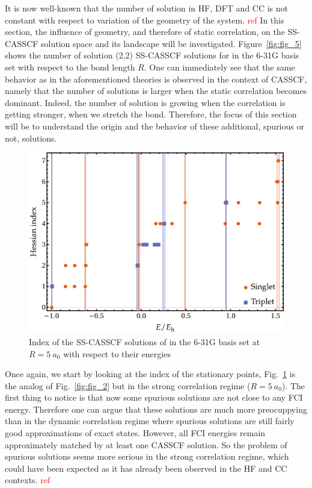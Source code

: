\documentclass[aps,prb,reprint,showkeys,superscriptaddress]{revtex4-1}
\newcommand{\todo}[1]{\textcolor{red}{#1}}
\begin{document}
It is now well-known that the number of solution in HF, DFT and CC is not constant with respect to variation of the geometry of the system. \todo{ref}
In this section, the influence of geometry, and therefore of static correlation, on the SS-CASSCF solution space and its landscape will be investigated.
Figure~\ref{fig:fig_5} shows the number of solution (2,2) SS-CASSCF solutions for  in the 6-31G basis set with respect to the bond length $R$.
One can immediately see that the same behavior as in the aforementioned theories is observed in the context of CASSCF, namely that the number of solutions is larger when the static correlation becomes dominant.
Indeed, the number of solution is growing when the correlation is getting stronger, \ie when we stretch the bond.
Therefore, the focus of this section will be to understand the origin and the behavior of these additional, spurious or not, solutions.

\begin{figure}
  \includegraphics[width=0.9\linewidth]{Figures/fig_3b.pdf}
  \caption{Index of the SS-CASSCF solutions of  in the 6-31G basis set at $R=5~a_0$ with respect to their energies
    \label{fig:fig_6}}
\end{figure}

Once again, we start by looking at the index of the stationary points, Fig.~\ref{fig:fig_6} is the analog of Fig.~\ref{fig:fig_2} but in the strong correlation regime ($R=5~a_0$).
The first thing to notice is that now some spurious solutions are not close to any FCI energy.
Therefore one can argue that these solutions are much more preocuppying than in the dynamic correlation regime where spurious solutions are still fairly good approximations of exact states.
However, all FCI energies remain approximately matched by at least one CASSCF solution.
So the problem of spurious solutions seems more serious in the strong correlation regime, which could have been expected as it has already been observed in the HF and CC contexts. \todo{ref}
\end{document}
